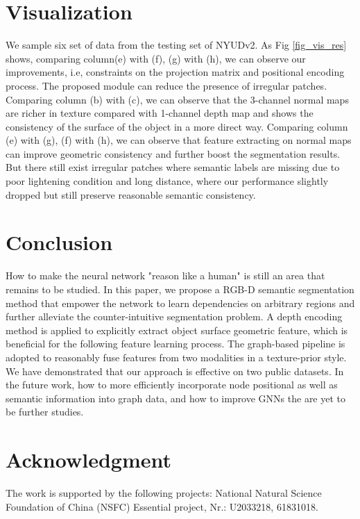 ﻿\documentclass[journal]{IEEEtran}
\begin{document}
    \section{Visualization}
    We sample six set of data from the testing set of NYUDv2. As Fig \ref{fig_vis_res} shows, comparing column(e) with (f), (g) with (h), we can observe our improvements, i.e, constraints on the projection matrix and positional encoding process. The proposed module can reduce the presence of irregular patches. Comparing column (b) with (c), we can observe that the 3-channel normal maps are richer in texture compared with 1-channel depth map and shows the consistency of the surface of the object in a more direct way. Comparing column (e) with (g), (f) with (h), we can observe that feature extracting on normal maps can improve geometric consistency and further boost the segmentation results. But there still exist irregular patches where semantic labels are missing due to poor lightening condition and long distance, where our performance slightly dropped but still preserve reasonable semantic consistency.


    
\section{Conclusion}
    How to make the neural network "reason like a human" is still an area that remains to be studied. In this paper, we propose a RGB-D semantic segmentation method that empower the network to learn dependencies on arbitrary regions and further alleviate the counter-intuitive segmentation problem. A depth encoding method is applied to explicitly extract object surface geometric feature, which is beneficial for the following feature learning process. The graph-based pipeline is adopted to reasonably fuse features from two modalities in a texture-prior style. We have demonstrated that our approach is effective on two public datasets. In the future work, how to more efficiently incorporate node positional as well as semantic information into graph data, and how to improve GNNs the are yet to be further studies.

\section*{Acknowledgment}
    The work is supported by the following projects: National Natural Science Foundation of China (NSFC) Essential project, Nr.: U2033218, 61831018.
 




\end{document}
